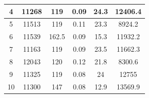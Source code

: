 \documentclass[
  digital, %
  oneside,
  notable, %
  nolof,     %
  nolot     %
]{fithesis3}
\begin{document}
\begin{table}[]
\begin{tabular}{|c|c|c|c|c|c|}
	4                & 11268                                                        & 119                                                                    & 0.09                                                                   & 24.3                                                                 & 12406.4                                                         \\ \hline
	5                & 11513                                                        & 119                                                                    & 0.11                                                                   & 23.3                                                                 & 8924.2                                                          \\ \hline
	6                & 11539                                                        & 162.5                                                                  & 0.09                                                                   & 15.3                                                                 & 11932.2                                                         \\ \hline
	7                & 11163                                                        & 119                                                                    & 0.09                                                                   & 23.5                                                                 & 11662.3                                                         \\ \hline
	8                & 12043                                                        & 120                                                                    & 0.12                                                                   & 21.8                                                                 & 8300.6                                                          \\ \hline
	9                & 11325                                                        & 119                                                                    & 0.08                                                                   & 24                                                                   & 12755                                                           \\ \hline
	10               & 11300                                                        & 147                                                                    & 0.08                                                                   & 12.9                                                                 & 13569.9                                                         \\ \hline

\end{tabular}
\end{table}
\end{document}
